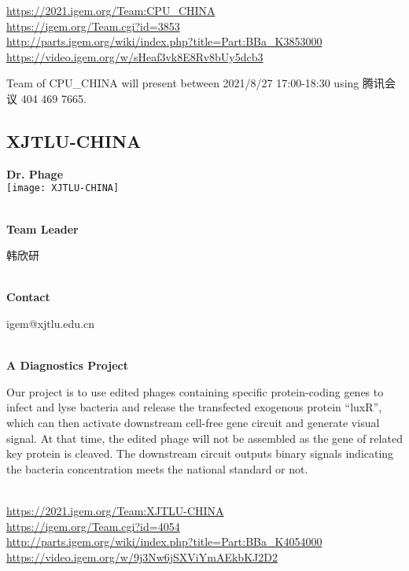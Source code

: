 \url{https://2021.igem.org/Team:CPU\_CHINA }\\
\url{https://igem.org/Team.cgi?id=3853 }\\
\url{http://parts.igem.org/wiki/index.php?title=Part:BBa_K3853000 }\\
\url{https://video.igem.org/w/sHeaf3vk8E8Rv8bUy5dcb3 }\\

\vfill{}









Team of CPU\_CHINA will present between   2021/8/27 17:00-18:30      using 腾讯会议 404 469 7665.
\newpage


\subsection{\textcolor{Blu}{ XJTLU-CHINA } }
\vspace{5mm}
\begin{center}
\large{
  \textbf{ Dr. Phage }\\
  \texttt{[image: XJTLU-CHINA]}
}
\end{center}
\textbf{\\Team Leader}

  韩欣研


\textbf{\\Contact}

  igem@xjtlu.edu.cn


\textbf{\\A Diagnostics Project\\}\begin{spacing}{1.5}

Our project is to use edited phages containing specific protein-coding genes to infect and lyse bacteria and release the transfected exogenous protein “luxR”, which can then activate downstream cell-free gene circuit and generate visual signal. At that time, the edited phage will not be assembled as the gene of related key protein is cleaved. The downstream circuit outputs binary signals indicating the bacteria concentration meets the national standard or not.\end{spacing}
\\

\url{https://2021.igem.org/Team:XJTLU-CHINA }\\
\url{https://igem.org/Team.cgi?id=4054 }\\
\url{http://parts.igem.org/wiki/index.php?title=Part:BBa_K4054000 }\\
\url{https://video.igem.org/w/9j3Nw6jSXViYmAEkbKJ2D2 }\\


